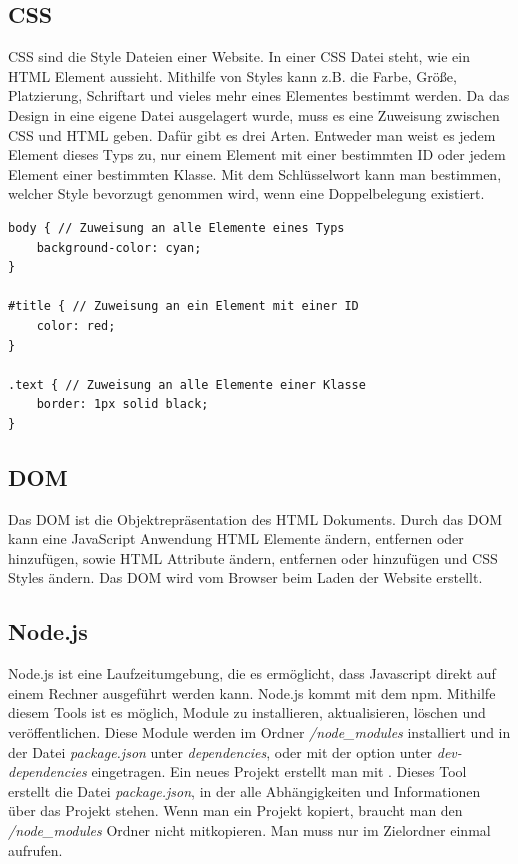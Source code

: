 \subsection{CSS}
\ac{CSS} sind die Style Dateien einer Website. In einer \ac{CSS} Datei steht, wie ein \ac{HTML} Element aussieht. Mithilfe von Styles kann z.B. die Farbe, Größe, Platzierung, Schriftart und vieles mehr eines Elementes bestimmt werden. Da das Design in eine eigene Datei ausgelagert wurde, muss es eine Zuweisung zwischen \ac{CSS} und \ac{HTML} geben. Dafür gibt es drei Arten. Entweder man weist es jedem Element dieses Typs zu, nur einem Element mit einer bestimmten ID oder jedem Element einer bestimmten Klasse. Mit dem Schlüsselwort  kann man bestimmen, welcher Style bevorzugt genommen wird, wenn eine Doppelbelegung existiert.

\begin{lstlisting}[caption=Zuweisen von Design an HTML,style=css,label=CSS-Beispiel]
body { // Zuweisung an alle Elemente eines Typs
	background-color: cyan;
}

#title { // Zuweisung an ein Element mit einer ID
	color: red;
}

.text { // Zuweisung an alle Elemente einer Klasse
	border: 1px solid black;
}
\end{lstlisting}


\subsection{DOM}
\label{sec:vor-dom}
Das \ac{DOM} ist die Objektrepräsentation des \ac{HTML} Dokuments. Durch das \ac{DOM} kann eine JavaScript Anwendung \ac{HTML} Elemente ändern, entfernen oder hinzufügen, sowie \ac{HTML} Attribute ändern, entfernen oder hinzufügen und \ac{CSS} Styles ändern. Das \ac{DOM} wird vom Browser beim Laden der Website erstellt. 

\subsection{Node.js}
\label{sec:vor-node}
Node.js ist eine Laufzeitumgebung, die es ermöglicht, dass Javascript direkt auf einem Rechner ausgeführt werden kann. Node.js kommt mit dem \acf{npm}. Mithilfe diesem Tools ist es möglich, Module zu installieren, aktualisieren, löschen und veröffentlichen. Diese Module werden im Ordner \textit{/node\_modules} installiert und in der Datei \textit{package.json} unter \textit{dependencies}, oder mit der option  unter \textit{dev-dependencies} eingetragen. Ein neues Projekt erstellt man mit . Dieses Tool erstellt die Datei \textit{package.json}, in der alle Abhängigkeiten und Informationen über das Projekt stehen. Wenn man ein Projekt kopiert, braucht man den \textit{/node\_modules} Ordner nicht mitkopieren. Man muss nur im Zielordner einmal  aufrufen.

